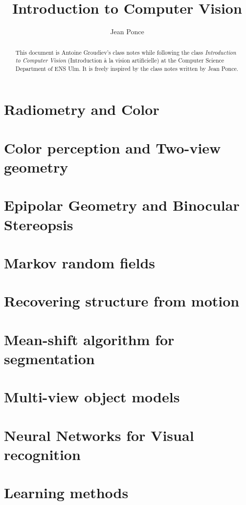\documentclass[toc, titlepaged]{../cs-classes/cs-classes}
\title{Introduction to Computer Vision}
\author{Jean Ponce}
\begin{document}
\begin{abstract}
    This document is Antoine Groudiev's class notes while following the class \emph{Introduction to Computer Vision} (Introduction à la vision artificielle) at the Computer Science Department of ENS Ulm. It is freely inspired by the class notes written by Jean Ponce.
\end{abstract}







\section{Radiometry and Color}

\section{Color perception and Two-view geometry}

\section{Epipolar Geometry and Binocular Stereopsis}

\section{Markov random fields}

\section{Recovering structure from motion}

\section{Mean-shift algorithm for segmentation}

\section{Multi-view object models}

\section{Neural Networks for Visual recognition}

\section{Learning methods}
\end{document}
